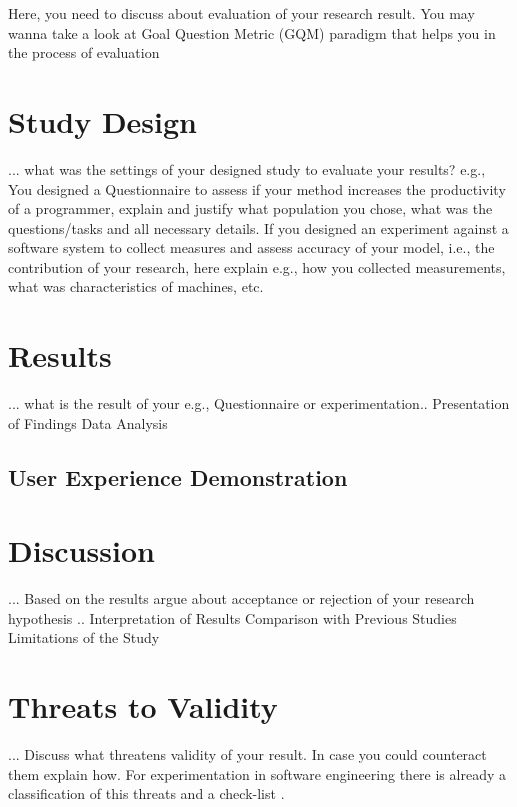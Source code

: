 Here, you need to discuss about evaluation of your research result. You may wanna take a look at Goal Question Metric (GQM) paradigm that helps you in the process of evaluation \cite{caldiera1994goal}

\section{Study Design}
... what was the settings of your designed study to evaluate your results? e.g., You designed a Questionnaire to assess if your method increases the productivity of a programmer, explain and justify what population you chose, what was the questions/tasks and all necessary details. If you designed an experiment against a software system to collect measures and assess accuracy of your model, i.e., the contribution of your research, here explain e.g., how you collected measurements, what was characteristics of machines, etc.

\section{Results}
... what is the result of your e.g., Questionnaire or experimentation.. 
Presentation of Findings
Data Analysis
\subsection{User Experience Demonstration}

\section{Discussion}


... Based on the results argue about acceptance or rejection of your research hypothesis   .. 
Interpretation of Results
Comparison with Previous Studies
Limitations of the Study


\section{Threats to Validity}
... Discuss what threatens validity of your result. In case you could counteract them explain how. For experimentation in software engineering there is already a classification of this threats and a check-list \cite{DBLP:journals/ese/RunesonH09}.   

